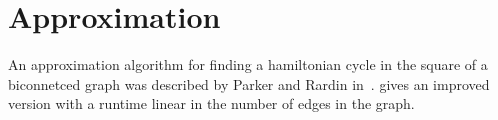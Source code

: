 \chapter{Approximation}

An approximation algorithm for finding a hamiltonian cycle in the square of a biconnetced graph was described by Parker and Rardin in~\cite{ParkerRardin1984}. \cite{alstrup2018hamiltonian} gives an improved version with a runtime linear in the number of edges in the graph.